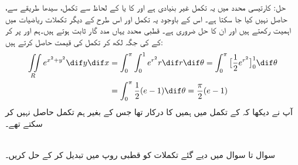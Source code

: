 حل:\quad
کارتیسی محدد میں یہ تکمل غیر بنیادی ہے اور  کا  یا   کے لحاظ سے تکمل، سیدھا طریقے سے،   حاصل نہیں کیا جا سکتا ہے۔ اس کے باوجود یہ تکمل اور اس طرح کے دیگر تکملات ریاضیات میں اہمیت رکھتے ہیں اور ان کا حل ضروری ہے۔ قطبی محدد یہاں مدد گار ثابت ہوتے ہیں۔ہم  اور  پر کر کے  کی جگہ  لکھ کر تکمل کی قیمت حاصل کرتے ہیں:
\begin{align*}
\iint\limits_R e^{x^2+y^2}\dif y\dif x&=\int_0^{\pi}\int_0^1 e^{r^2}r\dif r\dif \theta=\int_0^{\pi}\big[\frac{1}{2}e^{r^2}\big]_0^1\dif\theta\\
&=\int_0^{\pi}\frac{1}{2}(e-1)\dif\theta=\frac{\pi}{2}(e-1)
\end{align*}
آپ نے دیکھا کہ     کے تکمل میں ہمیں    کا  درکار  تھا  جس کے بغیر ہم تکمل حاصل نہیں کر سکتے  تھے۔

\\
سوال  تا سوال   میں دیے گئے تکملات کو  قطبی روپ میں تبدیل کر کے حل کریں۔

